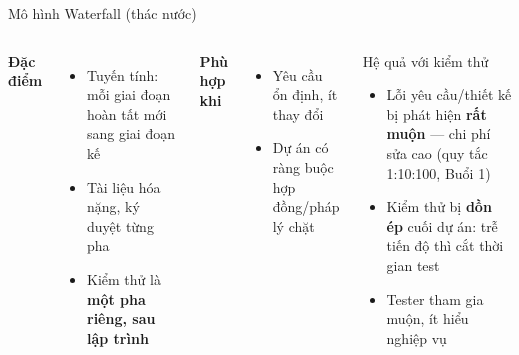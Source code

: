 \documentclass[aspectratio=169,12pt]{beamer}
\begin{document}
\begin{frame}{Mô hình Waterfall (thác nước)}
  \begin{columns}[T]
    \textbf{Đặc điểm}
    \begin{itemize}
      \item Tuyến tính: mỗi giai đoạn hoàn tất mới sang giai đoạn kế
      \item Tài liệu hóa nặng, ký duyệt từng pha
      \item Kiểm thử là \textbf{một pha riêng, sau lập trình}
    \end{itemize}
    \textbf{Phù hợp khi}
    \begin{itemize}
      \item Yêu cầu ổn định, ít thay đổi
      \item Dự án có ràng buộc hợp đồng/pháp lý chặt
    \end{itemize}

    \begin{alertblock}{Hệ quả với kiểm thử}
      \begin{itemize}
        \item Lỗi yêu cầu/thiết kế bị phát hiện \textbf{rất muộn} --- chi phí sửa cao (quy tắc 1:10:100, Buổi 1)
        \item Kiểm thử bị \textbf{dồn ép} cuối dự án: trễ tiến độ thì cắt thời gian test
        \item Tester tham gia muộn, ít hiểu nghiệp vụ
      \end{itemize}
    \end{alertblock}
  \end{columns}
\end{frame}
\end{document}
